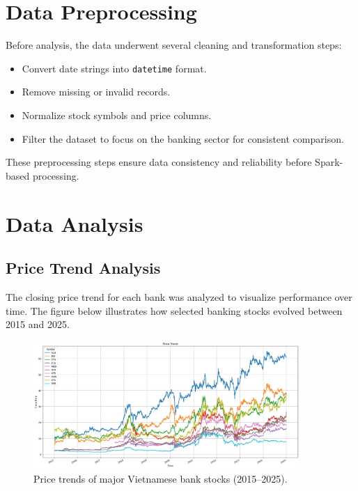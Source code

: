 \documentclass[12pt,a4paper]{article}
\begin{document}
\section{Data Preprocessing}

Before analysis, the data underwent several cleaning and transformation steps:

\begin{itemize}
    \item Convert date strings into \texttt{datetime} format.
    \item Remove missing or invalid records.
    \item Normalize stock symbols and price columns.
    \item Filter the dataset to focus on the banking sector for consistent comparison.
\end{itemize}

These preprocessing steps ensure data consistency and reliability before Spark-based processing.

\section{Data Analysis}

\subsection{Price Trend Analysis}
The closing price trend for each bank was analyzed to visualize performance over time.  
The figure below illustrates how selected banking stocks evolved between 2015 and 2025.

\begin{figure}[h!]
    \centering
    \includegraphics[width=0.9\textwidth]{price_trend.png}
    \caption{Price trends of major Vietnamese bank stocks (2015–2025).}
    \label{fig:trend}
\end{figure}
\end{document}
